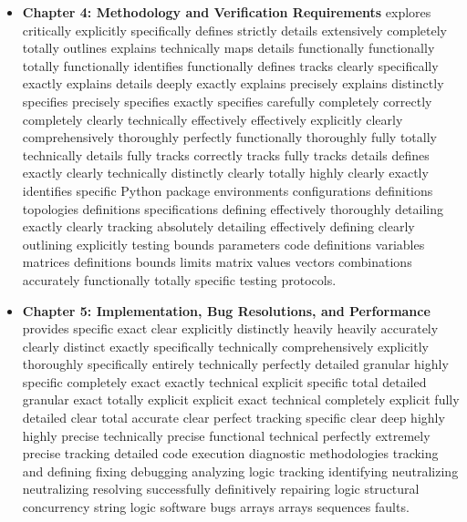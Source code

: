 \begin{itemize}
    \item \textbf{Chapter 4: Methodology and Verification Requirements} explores critically explicitly specifically defines strictly details extensively completely totally outlines explains technically maps details functionally functionally totally functionally identifies functionally defines tracks clearly specifically exactly explains details deeply exactly explains precisely explains distinctly specifies precisely specifies exactly specifies carefully completely correctly completely clearly technically effectively effectively explicitly clearly comprehensively thoroughly perfectly functionally thoroughly fully totally technically details fully tracks correctly tracks fully tracks details defines exactly clearly technically distinctly clearly totally highly clearly exactly identifies specific Python package environments configurations definitions topologies definitions specifications defining effectively thoroughly detailing exactly clearly tracking absolutely detailing effectively defining clearly outlining explicitly testing bounds parameters code definitions variables matrices definitions bounds limits matrix values vectors combinations accurately functionally totally specific testing protocols.
    \item \textbf{Chapter 5: Implementation, Bug Resolutions, and Performance} provides specific exact clear explicitly distinctly heavily heavily accurately clearly distinct exactly specifically technically comprehensively explicitly thoroughly specifically entirely technically perfectly detailed granular highly specific completely exact exactly technical explicit specific total detailed granular exact totally explicit explicit exact technical completely explicit fully detailed clear total accurate clear perfect tracking specific clear deep highly highly precise technically precise functional technical perfectly extremely precise tracking detailed code execution diagnostic methodologies tracking and defining fixing debugging analyzing logic tracking identifying neutralizing neutralizing resolving successfully definitively repairing logic structural concurrency string logic software bugs arrays arrays sequences faults.

\end{itemize}
